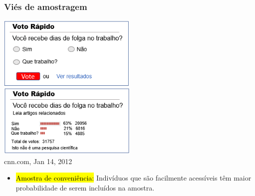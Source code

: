 \begin{frame}
\frametitle{Viés de amostragem}

\begin{center}
\includegraphics[width=0.5\textwidth]{1-3_data_collection_principles/vol_resp_bias_q.png}\pause
\includegraphics[width=0.5\textwidth]{1-3_data_collection_principles/vol_resp_bias_res.png} \\
{\tiny cnn.com, Jan 14, 2012}
\end{center}
\begin{itemize}
\pause
\justifying
\item \hl{Amostra de conveniência:} Indivíduos que são facilmente acessíveis têm maior probabilidade de serem incluídos na amostra.

\end{itemize}

\end{frame}


